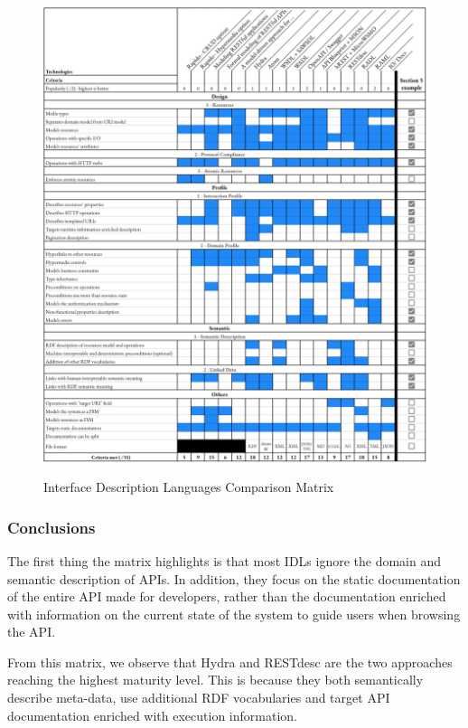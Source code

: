\begin{figure}[ht]
\caption{Interface Description Languages Comparison Matrix}
\includegraphics[width=1\textwidth]{figures/IDL.png}
\label{idl-matrix}
\end{figure}

\subsubsection{Conclusions}

The first thing the matrix highlights is that most IDLs ignore the domain and semantic description of APIs. In addition, they focus on the static documentation of the entire API made for developers, rather than the documentation enriched with information on the current state of the system to guide users when browsing the API.

From this matrix, we observe that Hydra and RESTdesc are the two approaches reaching the highest maturity level. This is because they both semantically describe meta-data, use additional RDF vocabularies and target API documentation enriched with execution information.

